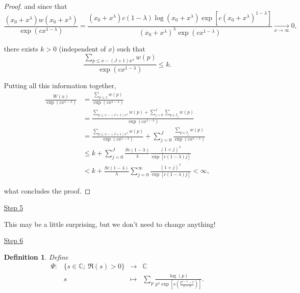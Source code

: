 \documentclass[11pt]{amsart}
\newtheorem{defi}[theorem]{Definition}
\numberwithin{equation}{section}
\newcommand{\C}{\mathbb{C}}
\newcommand{\disum}{\displaystyle \sum}
\newcommand{\difrac}{\displaystyle \frac}
\begin{document}
\begin{proof}
\noindent and since that $$\difrac{(x_0 + x^{\lambda})w(x_0 + x^{\lambda})}{\exp(cx^{1 - \lambda})} = \difrac{(x_0 + x^{\lambda})c(1 - \lambda) \log(x_0 + x^{\lambda}) \exp[c(x_0 + x^{\lambda})^{1 - \lambda}]}{(x_0 + x^{\lambda})^{\lambda} \exp(cx^{1 - \lambda})} \xrightarrow[x \to \infty]{} 0,$$

\noindent there exists $k > 0$ (independent of $x$) such that $$\difrac{\disum_{p \leq x - (J + 1)x^{\lambda}} w(p)}{\exp(cx^{1 - \lambda})} \leq k.$$

Putting all this information together, \begin{equation*} \begin{split} \difrac{W(x)}{\exp(cx^{1 - \lambda})} & = \difrac{\disum_{p \leq x} w(p)}{\exp(cx^{1 - \lambda})} \\ & = \difrac{\disum_{p \leq x - (J + 1)x^{\lambda}} w(p) + \disum_{j = 0}^{J} \disum_{p \in I_j} w(p)}{\exp(cx^{1 - \lambda})} \\ & = \difrac{\disum_{p \leq x - (J + 1)x^{\lambda}} w(p)}{\exp(cx^{1 - \lambda})} + \disum_{j = 0}^{J} \difrac{\disum_{p \in I_j} w(p)}{\exp(cx^{1 - \lambda})} \\ & \leq k + \disum_{j = 0}^{J} \difrac{Sc(1 - \lambda)}{\lambda} \difrac{(1 + j)^{\lambda}}{\exp[c(1 - \lambda)j]} \\ & < k + \difrac{Sc(1 - \lambda)}{\lambda} \disum_{j = 0}^{\infty} \difrac{(1 + j)^{\lambda}}{\exp[c(1 - \lambda)j]} < \infty, \end{split} \end{equation*}

\noindent what concludes the proof. \end{proof}

\vspace{2mm} \begin{center} \underline{Step 5} \end{center}

\vspace{3mm} This may be a little surprising, but we don't need to change anything!

\newpage

\begin{center} \underline{Step 6} \end{center}

\begin{defi}
Define $$\begin{matrix}
\Psi: & \{s \in \C; \ \Re(s) > 0\} & \rightarrow & \C \\ & s & \mapsto & \disum_p \difrac{\log(p)}{p^{\lambda}\exp\left[s \left(\difrac{p^{1 - \lambda} - 1}{1 - \lambda}\right)\right]}. \end{matrix}$$
\end{defi}
\end{document}
